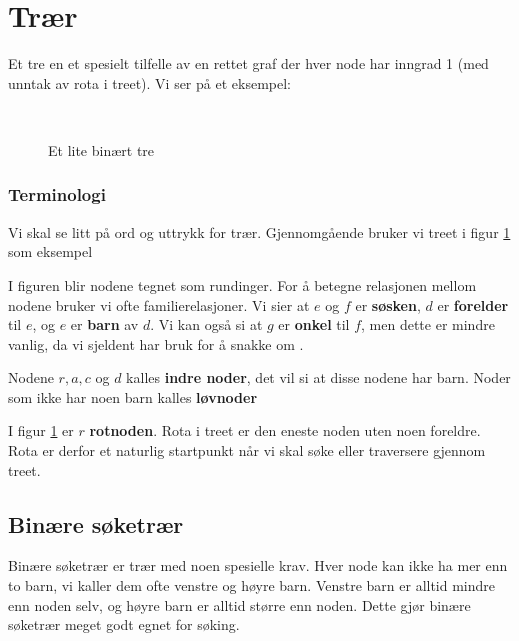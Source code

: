 

\section{Trær}
Et tre en et spesielt tilfelle av en rettet graf der hver node har inngrad 1 (med unntak av rota i treet). Vi ser på et eksempel:
\begin{figure}[H]
\caption{Et lite binært tre}
\label{fig:tre}
\centering
~\\
\end{figure}

\subsubsection{Terminologi}
Vi skal se litt på ord og uttrykk for trær. Gjennomgående bruker vi treet i figur \ref{fig:tre} som eksempel

I figuren blir nodene tegnet som rundinger. For å betegne relasjonen mellom nodene bruker vi ofte familierelasjoner. Vi sier at $ e $ og $ f $ er \textbf{søsken}, $ d $ er \textbf{forelder} til $ e $, og $ e $ er \textbf{barn} av $ d $. Vi kan også si at $ g $ er \textbf{onkel} til $ f $, men dette er mindre vanlig, da vi sjeldent har bruk for å snakke om . 

Nodene $ r, a, c $ og $ d $ kalles \textbf{indre noder}, det vil si at disse nodene har barn. Noder som ikke har noen barn kalles \textbf{løvnoder}

I figur \ref{fig:tre} er $ r $ \textbf{rotnoden}. Rota i treet er den eneste noden uten noen foreldre. Rota er derfor et naturlig startpunkt når vi skal søke eller traversere gjennom treet. 


\subsection{Binære søketrær}
\label{bintraer}
Binære søketrær er trær med noen spesielle krav. Hver node kan ikke ha mer enn to barn, vi kaller dem ofte venstre og høyre barn. Venstre barn er alltid mindre enn noden selv, og høyre barn er alltid større enn noden. Dette gjør binære søketrær meget godt egnet for søking. 

